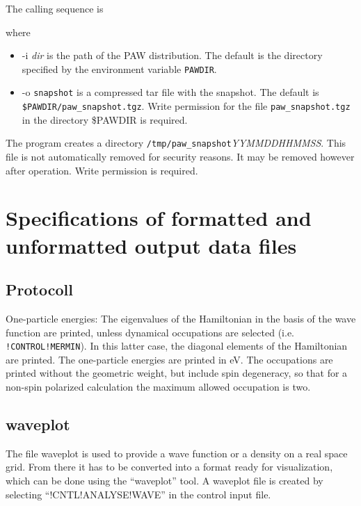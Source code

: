 \documentclass[final,12pt]{article}
\begin{document}
{{{The calling sequence is

\bigskip{}
\bigskip

where 
\begin{itemize}
\item -i \textit{dir} is the path of the PAW distribution. The default
  is the directory specified by the environment variable
  \texttt{PAWDIR}.
\item -o \texttt{snapshot} is a compressed tar file with the
  snapshot. The default is \texttt{\$PAWDIR/paw\_snapshot.tgz}.  Write
  permission for the file \texttt{paw\_snapshot.tgz} in the directory
  \$PAWDIR is required.  
\end{itemize}
The program creates a directory
\texttt{/tmp/paw\_snapshot}\textit{YYMMDDHHMMSS}. This file is not
automatically removed for security reasons. It may be removed however
after operation. Write permission is required.


\newpage
\section{Specifications of formatted and unformatted output data files}
\subsection{Protocoll}
One-particle energies: The eigenvalues of the Hamiltonian in the basis
of the wave function are printed, unless dynamical occupations are
selected (i.e. \texttt{!CONTROL!MERMIN}). In this latter case, the
diagonal elements of the Hamiltonian are printed. The one-particle
energies are printed in eV. The occupations are printed without the
geometric weight, but include spin degeneracy, so that for a non-spin
polarized calculation the maximum allowed occupation is two.



\subsection{waveplot}
The file waveplot is used to provide a wave function or a density on
a real space grid. From there it has to be converted into a format
ready for visualization, which can be done using the ``waveplot'' tool.
A waveplot file is created by selecting ``!CNTL!ANALYSE!WAVE'' in the
control input file.


}}}
\end{document}

